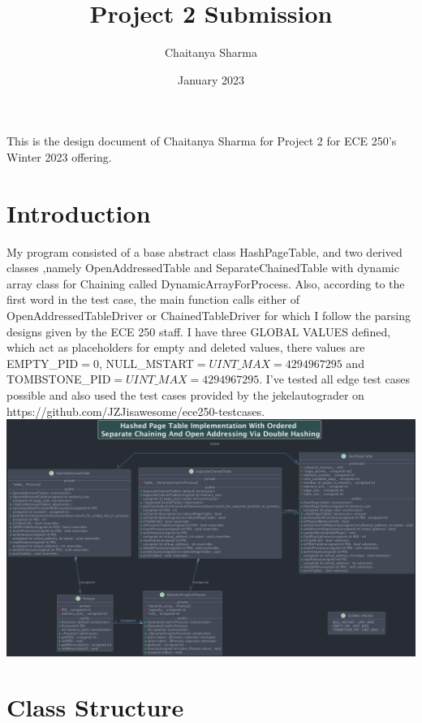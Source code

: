 \documentclass[a4paper]{article}
\title{Project 2 Submission}
\author{Chaitanya Sharma}
\date{January 2023}
\makeatletter
\renewenvironment{abstract}{%
    \if@twocolumn
    \section*{\abstractname}%
    \else
    \begin{center}%
    {\bfseries \Large\abstractname\vspace{\z@}}
    \end{center}%
    \quotation
    \fi}
    {\if@twocolumn\else\endquotation\fi}
\makeatother
\begin{document}
    \begin{center}
        \begin{abstract}
            This is the design document of Chaitanya Sharma for Project 2 for ECE 250's Winter 2023 offering.
        \end{abstract}
    \end{center}


    \section{Introduction}
    My program consisted of a base abstract class {\color{draculapurple}HashPageTable}, and two derived classes ,namely {\color{draculapurple}OpenAddressedTable} and
        {\color{draculapurple}SeparateChainedTable} with dynamic array class for Chaining called {\color{draculapurple}DynamicArrayForProcess}.
    Also, according to the first word in the test case, the {\color{draculapurple}main} function calls
    either of {\color{draculapurple}OpenAddressedTableDriver} or {\color{draculapurple}ChainedTableDriver} for which I follow the
    parsing designs given by the ECE 250 staff.
    I have three {\color{Awesome}GLOBAL VALUES} defined,
    which act as placeholders for empty and deleted values, there values are {\color{LimeGreen}EMPTY\_PID}$=0$,
        {\color{LimeGreen}NULL\_MSTART}$=UINT\_MAX=4294967295$ and {\color{LimeGreen}TOMBSTONE\_PID}$=UINT\_MAX=4294967295$.
    \newline I've tested all edge test cases possible and also used the test cases provided by the
    jekelautograder on {\color{DarkPastelBlue}https://github.com/JZJisawesome/ece250-testcases}.
    \newline
    \includegraphics[scale=0.145, center]{PageTable.png}


    \section{Class Structure}
\end{document}
